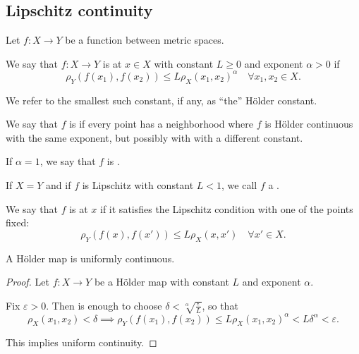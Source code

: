 \subsection{Lipschitz continuity}\label{subsec:lipschitz_continuity}

\begin{definition}\label{def:lipschitz_continuity}
  Let \( f: X \to Y \) be a function between metric spaces.

  \begin{thmenum}
     We say that \( f: X \to Y \) is  at \( x \in X \) with constant \( L \geq 0 \) and exponent \( \alpha > 0 \) if
    \begin{equation*}
      \rho_Y(f(x_1), f(x_2)) \leq L \rho_X(x_1, x_2)^\alpha \quad\forall x_1, x_2 \in X.
    \end{equation*}

    We refer to the smallest such constant, if any, as \enquote{the} H\"older constant.

     We say that \( f \) is  if every point has a neighborhood where \( f \) is H\"older continuous with the same exponent, but possibly with with a different constant.

     If \( \alpha = 1 \), we say that \( f \) is .

     If \( X = Y \) and if \( f \) is Lipschitz with constant \( L < 1 \), we call \( f \) a .

    \cite[53]{DontchevRockafellar2014} We say that \( f \) is  at \( x \) if it satisfies the Lipschitz condition with one of the points fixed:
    \begin{equation*}
      \rho_Y(f(x), f(x')) \leq L \rho_X(x, x') \quad\forall x' \in X.
    \end{equation*}
  \end{thmenum}
\end{definition}

\begin{proposition}\label{thm:holder_map_is_uniformly_continuous}
  A H\"older map is uniformly continuous.
\end{proposition}
\begin{proof}
  Let \( f: X \to Y \) be a H\"older map with constant \( L \) and exponent \( \alpha \).

  Fix \( \varepsilon > 0 \). Then is enough to choose \( \delta < \sqrt[\alpha]{\frac \varepsilon L} \), so that
  \begin{equation*}
    \rho_X(x_1, x_2) < \delta \implies \rho_Y(f(x_1), f(x_2)) \leq L \rho_X(x_1, x_2)^\alpha < L \delta^\alpha < \varepsilon.
  \end{equation*}

  This implies uniform continuity.
\end{proof}

